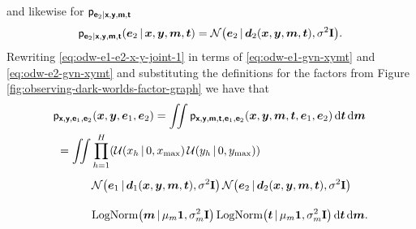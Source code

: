 and likewise for $\mathsf{p}_{\boldsymbol{\mathsf{e}}_2 | \boldsymbol{\mathsf{x}},\boldsymbol{\mathsf{y}},\boldsymbol{\mathsf{m}},\boldsymbol{\mathsf{t}}}$
\begin{equation}\label{eq:odw-e2-gvn-xymt}
  \pden{\rvct{e}_2 | \rvct{x},\rvct{y},\rvct{m},\rvct{t}}(\vct{e}_2\gvn\vct{x},\vct{y},\vct{m},\vct{t})
  =
  \nrm{\vct{e}_2 \gvn \vct{d}_2(\vct{x},\vct{y},\vct{m},\vct{t}),\sigma^2\idmtx}.
\end{equation}
Rewriting \eqref{eq:odw-e1-e2-x-y-joint-1} in terms of \eqref{eq:odw-e1-gvn-xymt} and \eqref{eq:odw-e2-gvn-xymt} and substituting the definitions for the factors from Figure \ref{fig:observing-dark-worlds-factor-graph} we have that
\begin{equation}\label{eq:odw-e1-e2-x-y-joint-2}
\begin{split}
  &\pden{\rvct{x},\rvct{y},\rvct{e}_1,\rvct{e}_2}(\vct{x},\vct{y},\vct{e}_1,\vct{e}_2) =
  \iint 
    \pden
      {\rvct{x},\rvct{y},\rvct{m},\rvct{t},\rvct{e}_1,\rvct{e}_2}
      (\vct{x},\vct{y},\vct{m},\vct{t},\vct{e}_1,\vct{e}_2)
   \,\dr\vct{t}\,\dr\vct{m}
  \\
  &
  ~=\iint
  \prod_{h=1}^H \lpa 
    \mathcal{U}\lpa x_h \gvn 0,x_{\textrm{max}}\rpa \,
    \mathcal{U}\lpa y_h \gvn 0,y_{\textrm{max}}\rpa 
  \rpa 
  \\
  &
  \phantom{~=\iint}~
    \nrm{\vct{e}_1 \gvn \vct{d}_1(\vct{x},\vct{y},\vct{m},\vct{t}),\sigma^2\idmtx}\,
    \nrm{\vct{e}_2 \gvn \vct{d}_2(\vct{x},\vct{y},\vct{m},\vct{t}),\sigma^2\idmtx}
  \\
  &\phantom{~=\iint}~
    \textrm{LogNorm}\lpa \vct{m} \gvn \mu_m\vct{1}, \sigma_m^2\idmtx \rpa \, 
    \textrm{LogNorm}\lpa \vct{t} \gvn \mu_m\vct{1}, \sigma_m^2\idmtx \rpa
  \,\dr\vct{t}\,\dr\vct{m}.
\end{split}
\end{equation}
